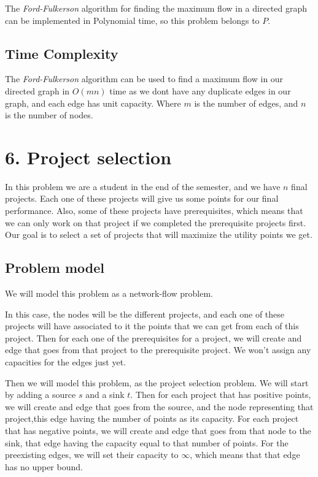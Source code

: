 \documentclass{article}
\begin{document}
The \textit{Ford-Fulkerson} algorithm for finding the maximum flow in a directed graph can be implemented in Polynomial time, so this problem belongs to $P$.

\subsection*{Time Complexity}

The \textit{Ford-Fulkerson} algorithm can be used to find a maximum flow in our directed graph in $O(mn)$ time as we dont have any duplicate edges in our graph, and each edge has unit capacity. 
Where $m$ is the number of edges, and $n$ is the number of nodes.

\section*{6. Project selection}

In this problem we are a student in the end of the semester, and we have $n$ final projects. Each one of these projects will give us some points for our final performance. Also, some of these projects have prerequisites, which means that we can only work on that project if we completed the prerequisite projects first. Our goal is to select a set of projects that will maximize the utility points we get.

\subsection*{Problem model}

We will model this problem as a network-flow problem.

In this case, the nodes will be the different projects, and each one of these projects will have associated to it the points that we can get from each of this project. Then for each one of the prerequisites for a project, we will create and edge that goes from that project to the prerequisite project. We won't assign any capacities for the edges just yet.

Then we will model this problem, as the project selection problem. We will start by adding a source $s$ and a sink $t$. Then for each project that has positive points, we will create and edge that goes from the source, and the node representing that project,this edge having the number of points as its capacity. For each project that has negative points, we will create and edge that goes from that node to the sink, that edge having the capacity equal to that number of points. For the preexisting edges, we will set their capacity to $\infty$, which means that that edge has no upper bound.
\end{document}
